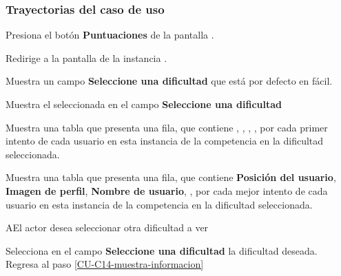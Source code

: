 \begin{UseCase}
{	}








\end{UseCase}

\subsubsection{Trayectorias del caso de uso}

\begin{UCtrayectoria}%
%

    \Actor Presiona el botón {\bf Puntuaciones} de la pantalla .

    \Sistema Redirige a la pantalla de la instancia .

    \Sistema Muestra un campo {\bf Seleccione una dificultad} que está por defecto en fácil. 

    \Sistema Muestra el  seleccionada en el campo {\bf Seleccione una dificultad}
    \label{CU-C14-muestra-informacion}

    \Sistema Muestra una tabla que presenta una fila, que contiene , , ,  , por cada primer intento de cada usuario en esta instancia de la competencia en la dificultad seleccionada.

    \Sistema Muestra una tabla que presenta una fila, que contiene {\bf Posición del usuario}, {\bf Imagen de perfil}, {\bf Nombre de usuario},  , por cada mejor intento de cada usuario en esta instancia de la competencia en la dificultad seleccionada.

\end{UCtrayectoria}

\begin{UCtrayectoriaA}{A}{El actor desea seleccionar otra dificultad a ver}

  \Actor Selecciona en el campo {\bf Seleccione una dificultad} la dificultad deseada.
  \Sistema Regresa al paso \ref{CU-C14-muestra-informacion}

\end{UCtrayectoriaA}
